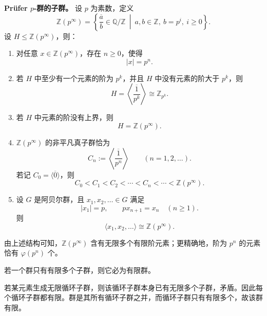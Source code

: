 \begin{proposition}\label{prop:prufer-subgroups}
\textbf{Prüfer $p$-群的子群。}
设 $p$ 为素数，定义
\[
  \mathbb Z(p^\infty)
  =\left\{\overline{\frac{a}{b}}\in\mathbb Q/\mathbb Z
  \ \middle|\ a,b\in\mathbb Z,\ b=p^i,\ i\geq0\right\}.
\]
设 $H\leq\mathbb Z(p^\infty)$，则：
\begin{enumerate}[label=(\arabic*)]
  \item 对任意 $x\in\mathbb Z(p^\infty)$，存在 $n\geq0$，使得
  \[
    |x|=p^n.
  \]

  \item 若 $H$ 中至少有一个元素的阶为 $p^k$，并且 $H$ 中没有元素的阶大于 $p^k$，则
  \[
    H=\left\langle\overline{\frac{1}{p^k}}\right\rangle
    \cong\mathbb Z_{p^k}.
  \]

  \item 若 $H$ 中元素的阶没有上界，则
  \[
    H=\mathbb Z(p^\infty).
  \]

  \item $\mathbb Z(p^\infty)$ 的非平凡真子群恰为
  \[
    C_n:=\left\langle\overline{\frac{1}{p^n}}\right\rangle
    \qquad(n=1,2,\ldots).
  \]
  若记 $C_0=\langle\overline0\rangle$，则
  \[
    C_0<C_1<C_2<\cdots<C_n<\cdots<\mathbb Z(p^\infty).
  \]

  \item 设 $G$ 是阿贝尔群，且 $x_1,x_2,\ldots\in G$ 满足
  \[
    |x_1|=p,\qquad px_{n+1}=x_n\quad(n\geq1).
  \]
  则
  \[
    \langle x_1,x_2,\ldots\rangle\cong\mathbb Z(p^\infty).
  \]
\end{enumerate}
\end{proposition}

\begin{purplenote}
由上述结构可知，$\mathbb Z(p^\infty)$ 含有无限多个有限阶元素；更精确地，阶为 $p^n$ 的元素恰有 $\varphi(p^n)$ 个。
\end{purplenote}

\begin{proposition}\label{prop:finitely-many-subgroups}
若一个群只有有限多个子群，则它必为有限群。
\end{proposition}

\begin{purpleproof}
若某元素生成无限循环子群，则该循环子群本身已有无限多个子群，矛盾。因此每个循环子群都有限。群是其所有循环子群之并，而循环子群只有有限多个，故该群有限。
\end{purpleproof}

